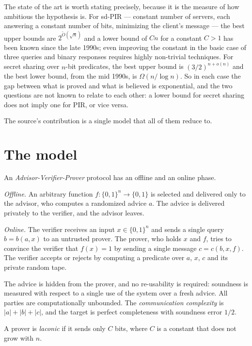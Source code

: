 \documentclass{aicr-conjecture}
\newcommand{\Om}{\Omega}
\newcommand{\bits}{\{0,1\}}
\begin{document}
The state of the art is worth stating precisely, because it is the
measure of how ambitious the hypothesis is. For sd-PIR --- constant number
of servers, each answering a constant number of bits, minimizing the
client's message --- the best upper bounds are $2^{\tilde{O}(\sqrt{n})}$
and a lower bound of $Cn$ for a constant $C > 1$ has been known since the
late 1990s; even improving the constant in the basic case of three
queries and binary responses requires highly non-trivial techniques. For
secret sharing over $n$-bit predicates, the best upper bound is
$(3/2)^{n+o(n)}$ and the best lower bound, from the mid 1990s, is
$\Om(n/\log n)$. So in each case the gap between what is proved and what
is believed is exponential, and the two questions are not known to relate
to each other: a lower bound for secret sharing does not imply one for
PIR, or vice versa.

The source's contribution is a single model that all of them reduce to.

\section{The model}\label{sec:model}

\begin{definition}\label{def:avp}
An \emph{Advisor-Verifier-Prover} protocol has an offline and an online
phase.

\emph{Offline.} An arbitrary function $f : \bits^{n} \to \bits$ is
selected and delivered only to the advisor, who computes a randomized
advice $a$. The advice is delivered privately to the verifier, and the
advisor leaves.

\emph{Online.} The verifier receives an input $x \in \bits^{n}$ and sends
a single query $b = b(a,x)$ to an untrusted prover. The prover, who holds
$x$ and $f$, tries to convince the verifier that $f(x) = 1$ by sending a
single message $c = c(b,x,f)$. The verifier accepts or rejects by
computing a predicate over $a$, $x$, $c$ and its private random tape.

The advice is hidden from the prover, and no re-usability is required:
soundness is measured with respect to a single use of the system over a
fresh advice. All parties are computationally unbounded. The
\emph{communication complexity} is $|a| + |b| + |c|$, and the target is
perfect completeness with soundness error $1/2$.
\end{definition}

\begin{definition}\label{def:laconic}
A prover is \emph{laconic} if it sends only $C$ bits, where $C$ is a
constant that does not grow with $n$.
\end{definition}
\end{document}
